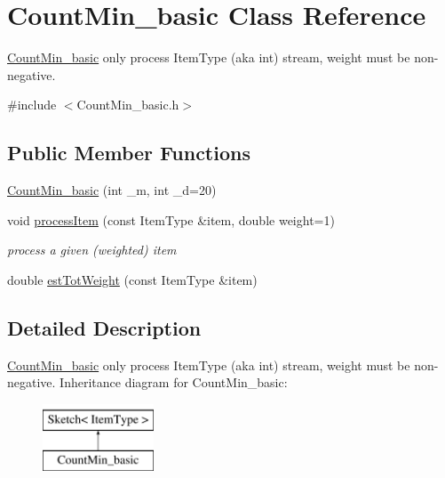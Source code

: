 \hypertarget{classCountMin__basic}{}\section{Count\+Min\+\_\+basic Class Reference}
\label{classCountMin__basic}


\hyperlink{classCountMin__basic}{Count\+Min\+\_\+basic} only process Item\+Type (aka int) stream, weight must be non-\/negative.  




{\ttfamily \#include $<$Count\+Min\+\_\+basic.\+h$>$}

\subsection*{Public Member Functions}
\begin{DoxyCompactItemize}
\item 
\hyperlink{classCountMin__basic_a3b783e86ad70334ef291dcb21ac8c1bc}{Count\+Min\+\_\+basic} (int \+\_\+m, int \+\_\+d=20)
\item 
void \hyperlink{classCountMin__basic_a55edb370e1689406374103df532cc7ce}{process\+Item} (const Item\+Type \&item, double weight=1)\hypertarget{classCountMin__basic_a55edb370e1689406374103df532cc7ce}{}\label{classCountMin__basic_a55edb370e1689406374103df532cc7ce}

\begin{DoxyCompactList}\small\item\em process a given (weighted) item \end{DoxyCompactList}\item 
double \hyperlink{classCountMin__basic_a6c9d299a3a2343403b4f653f41dee72a}{est\+Tot\+Weight} (const Item\+Type \&item)
\end{DoxyCompactItemize}


\subsection{Detailed Description}
\hyperlink{classCountMin__basic}{Count\+Min\+\_\+basic} only process Item\+Type (aka int) stream, weight must be non-\/negative. Inheritance diagram for Count\+Min\+\_\+basic\+:\begin{figure}[H]
\begin{center}
\leavevmode
\includegraphics[height=2.000000cm]{classCountMin__basic}
\end{center}
\end{figure}


